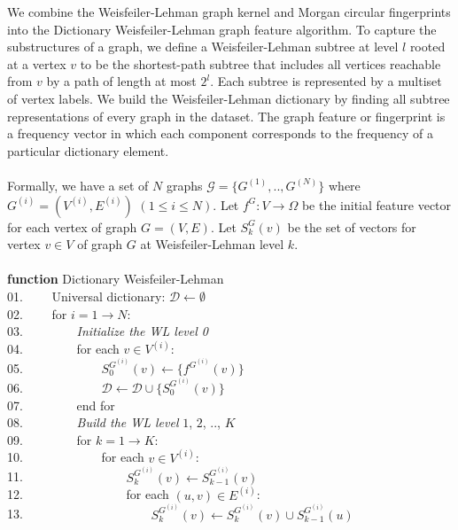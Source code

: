 \documentclass[a4paper]{article}
\begin{document}
We combine the Weisfeiler-Lehman graph kernel \cite{Nino} and Morgan circular fingerprints into the Dictionary Weisfeiler-Lehman graph feature algorithm. To capture the substructures of a graph, we define a Weisfeiler-Lehman subtree at level $l$ rooted at a vertex $v$ to be the shortest-path subtree that includes all vertices reachable from $v$ by a path of length at most $2^l$. Each subtree is represented by a multiset of vertex labels. We build the Weisfeiler-Lehman dictionary by finding all subtree representations of every graph in the dataset. The graph feature or fingerprint is a frequency vector in which each component corresponds to the frequency of a particular dictionary element. \\ \\
Formally, we have a set of $N$ graphs $\mathcal{G} = \{G^{(1)}, .., G^{(N)}\}$ where $G^{(i)} = (V^{(i)}, E^{(i)})$ $(1 \leq i \leq N)$. Let $f^G: V \rightarrow \Omega$ be the initial feature vector for each vertex of graph $G = (V, E)$. Let $S^G_k(v)$ be the set of vectors for vertex $v \in V$ of graph $G$ at Weisfeiler-Lehman level $k$. \\ \\
\textbf{function} Dictionary Weisfeiler-Lehman \\
01. \ \ \ \ Universal dictionary: $\mathcal{D} \leftarrow \emptyset$ \\
02. \ \ \ \ for $i = 1 \rightarrow N$: \\
03. \ \ \ \ \ \ \ \ \textit{Initialize the WL level 0} \\
04. \ \ \ \ \ \ \ \ for each $v \in V^{(i)}$: \\
05. \ \ \ \ \ \ \ \ \ \ \ \ $S^{G^{(i)}}_0(v) \leftarrow \{f^{G^{(i)}}(v)\}$ \\
06. \ \ \ \ \ \ \ \ \ \ \ \ $\mathcal{D} \leftarrow \mathcal{D} \cup \{S^{G^{(i)}}_0(v)\}$ \\
07. \ \ \ \ \ \ \ \ end for \\
08. \ \ \ \ \ \ \ \ \textit{Build the WL level} $1$, $2$, .., $K$ \\
09. \ \ \ \ \ \ \ \ for $k = 1 \rightarrow K$: \\
10. \ \ \ \ \ \ \ \ \ \ \ \ for each $v \in V^{(i)}$: \\
11. \ \ \ \ \ \ \ \ \ \ \ \ \ \ \ \ $S^{G^{(i)}}_k(v) \leftarrow S^{G^{(i)}}_{k - 1}(v)$ \\
12. \ \ \ \ \ \ \ \ \ \ \ \ \ \ \ \ for each $(u, v) \in E^{(i)}$: \\
13. \ \ \ \ \ \ \ \ \ \ \ \ \ \ \ \ \ \ \ \ $S^{G^{(i)}}_k(v) \leftarrow S^{G^{(i)}}_k(v) \cup S^{G^{(i)}}_{k - 1}(u)$ \\
\end{document}

